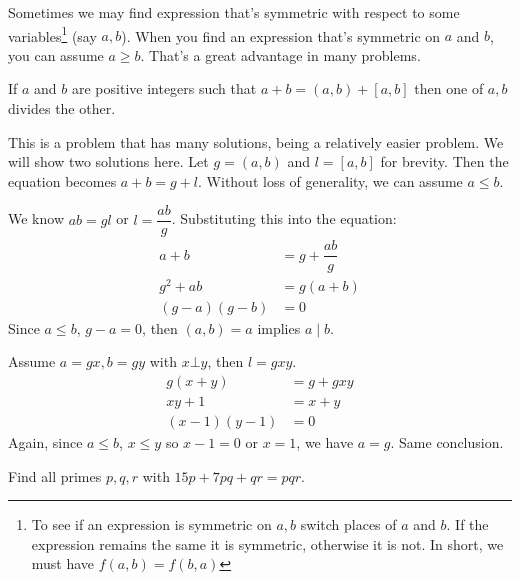 Sometimes we may find expression that's symmetric with respect to some variables\footnote{To see if an expression is symmetric on $a,b$ switch places of $a$ and $b$. If the expression remains the same it is symmetric, otherwise it is not. In short, we must have $f(a,b)=f(b,a)$} (say $a,b$). When you find an expression that's symmetric on $a$ and $b$, you can assume $a\geq b$. That's a great advantage in many problems.

\begin{problem}[Russia, $2000$]
	If $a$ and $b$ are positive integers such that $a+b=(a,b)+[a,b]$ then one of $a,b$ divides the other.
\end{problem}
This is a problem that has many solutions, being a relatively easier problem. We will show two solutions here. Let $g=(a,b)$ and $l=[a,b]$ for brevity. Then the equation becomes $a+b=g+l$. Without loss of generality, we can assume $a\leq b$.
\begin{solution}[First]
	We know $ab=gl$ or $l=\dfrac{ab}{g}$. Substituting this into the equation:
		\begin{align*}
			a+b & = g+\dfrac{ab}{g}\\
			g^2+ab & = g(a+b)\\
			(g-a)(g-b) & = 0
		\end{align*}
	Since $a\leq b$, $g-a=0$, then $(a,b)=a$ implies $a\mid b$.
\end{solution}

\begin{solution}[Second]
	Assume $a=gx,b=gy$ with $x\bot y$, then $l=gxy$.
		\begin{align*}
			g(x+y) & = g+gxy\\
			xy+1 & = x+y\\
			(x-1)(y-1) & = 0
		\end{align*}
	Again, since $a\leq b$, $x\leq y$ so $x-1=0$ or $x=1$, we have $a=g$. Same conclusion.
\end{solution}

\begin{problem}[Slovenia $2010$]
	Find all primes $p,q,r$ with $15p+7pq+qr=pqr$.
\end{problem}

